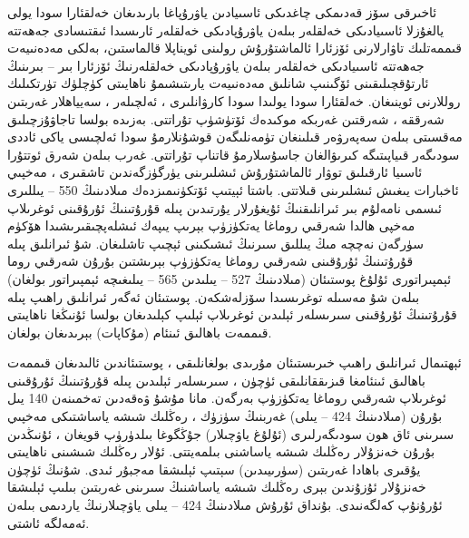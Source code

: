 \documentclass[a4paper]{article}
\begin{document}
\begin{flushright}
ئاخىرقى سۆز قەدىمكى چاغدىكى ئاسىيادىن ياۋرۇپاغا بارىدىغان خەلقئارا سودا يولى يالغۇزلا ئاسىيادىكى خەلقلەر بىلەن ياۋرۇپادىكى خەلقلەر ئارىسىدا ئىقتىسادى جەھەتتە قىممەتلىك تاۋارلارنى ئۆزئارا ئالماشتۇرۇش رولىنى ئويناپلا قالماستىن، بەلكى مەدەنىيەت جەھەتتە ئاسىيادىكى خەلقلەر بىلەن ياۋرۇپادىكى خەلقلەرنىڭ ئۆزئارا بىر – بىرىنىڭ ئارتۇقچىلىقىنى ئۆگىنىپ شانلىق مەدەنىيەت يارىتىشىمۇ ناھايىتى كۈچلۈك تۈرتكىلىك روللارنى ئوينىغان. خەلقئارا سودا يولىدا سودا كارۋانلىرى ، ئەلچىلەر ، سەيياھلار غەربتىن شەرققە ، شەرقتىن غەربكە موكىدەك ئۆتۈشۈپ تۇراتتى. بەزىدە بولسا تاجاۋۇزچىلىق مەقسىتى بىلەن سەپەرۋەر قىلىنغان تۈمەنلىگەن قوشۇنلارمۇ سودا ئەلچىسى ياكى ئاددى سودىگەر قىياپىتىگە كىرىۋالغان جاسۇسلارمۇ قاتناپ تۇراتتى. غەرب بىلەن شەرق ئوتتۇرا ئاسىيا ئارقىلىق توۋار ئالماشتۇرۇش ئىشلىرىنى يۈرگۈزگەندىن تاشقىرى ، مەخپىي ئاخبارات يىغىش ئىشلىرىنى قىلاتتى. باشتا ئېيتىپ ئۆتكۈنىمىزدەك مىلادىنىڭ 550 – يىللىرى ئىسمى نامەلۇم بىر ئىرانلىقنىڭ ئۇيغۇرلار يۇرتىدىن پىلە قۇرۇتىنىڭ ئۇرۇقىنى ئوغرىلاپ مەخپى ھالدا شەرقىي روماغا يەتكۈزۈپ بېرىپ يىپەك ئىشلەپچىقىرىشىدا ھۆكۈم سۈرگەن نەچچە مىڭ يىللىق سىرنىڭ ئىشىكىنى ئېچىپ تاشلىغان. شۇ ئىرانلىق پىلە قۇرۇتىنىڭ ئۇرۇقىنى شەرقىي روماغا يەتكۈزۈپ بېرىشتىن بۇرۇن شەرقىي روما ئېمپىراتورى ئۇلۇغ پوستىئان (مىلادىنىڭ 527 – يىلىدىن 565 – يىلىغىچە ئېمپىراتور بولغان) بىلەن شۇ مەسىلە توغرىسىدا سۆزلەشكەن. پوستىئان ئەگەر ئىرانلىق راھىپ پىلە قۇرۇتىنىڭ ئۇرۇقىنى سىرىسلەر ئېلىدىن ئوغرىلاپ ئېلىپ كېلىدىغان بولسا ئۇنىڭغا ناھايىتى قىممەت باھالىق ئىنئام (مۇكاپات) بېرىدىغان بولغان.



ئېھتىمال ئىرانلىق راھىپ خىرىستىئان مۇرىدى بولغانلىقى ، پوستىئاندىن ئالىدىغان قىممەت باھالىق ئىنئامغا قىزىققانلىقى ئۈچۈن ، سىرىسلەر ئېلىدىن پىلە قۇرۇتىنىڭ ئۇرۇقىنى ئوغرىلاپ شەرقىي روماغا يەتكۈزۈپ بەرگەن. مانا مۇشۇ ۋەقەدىن تەخمىنەن 140 يىل بۇرۇن (مىلادىنىڭ 424 – يىلى) غەربنىڭ سۈزۈك ، رەڭلىك شىشە ياساشتىكى مەخپىي سىرىنى ئاق ھون سودىگەرلىرى (ئۇلۇغ ياۋچىلار) جۇڭگوغا بىلدۈرۈپ قويغان ، ئۇنىڭدىن بۇرۇن خەنزۇلار رەڭلىك شىشە ياساشنى بىلمەيتتى. ئۇلار رەڭلىك شىشىنى ناھايىتى يۇقىرى باھادا غەربتىن (سۈرىيىدىن) سېتىپ ئېلىشقا مەجبۇر ئىدى. شۇنىڭ ئۈچۈن خەنزۇلار ئۇزۇندىن بېرى رەڭلىك شىشە ياساشنىڭ سىرىنى غەربتىن بىلىپ ئېلىشقا ئۇرۇنۇپ كەلگەنىدى. بۇنداق ئۇرۇش مىلادىنىڭ 424 – يىلى ياۋچىلارنىڭ ياردىمى بىلەن ئەمەلگە ئاشتى.




\end{flushright}
\end{document}
